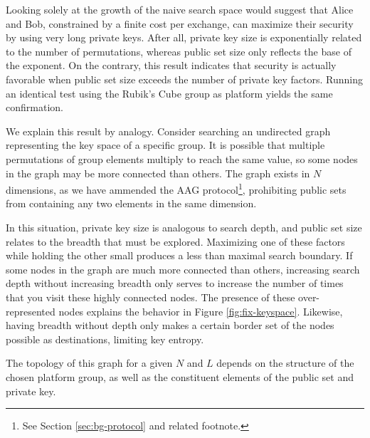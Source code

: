 Looking solely at the growth of the naive search space would suggest that Alice and Bob, constrained by a finite cost per exchange, can maximize their security by using very long private keys. After all, private key size is exponentially related to the number of permutations, whereas public set size only reflects the base of the exponent. On the contrary, this result indicates that security is actually favorable when public set size exceeds the number of private key factors. Running an identical test using the Rubik's Cube group as platform yields the same confirmation.

We explain this result by analogy. Consider searching an undirected graph representing the key space of a specific group. It is possible that multiple permutations of group elements multiply to reach the same value, so some nodes in the graph may be more connected than others. The graph exists in $N$ dimensions, as we have ammended the AAG protocol\footnote{See Section \ref{sec:bg-protocol} and related footnote.}, prohibiting public sets from containing any two elements in the same dimension.

In this situation, private key size is analogous to search depth, and public set size relates to the breadth that must be explored. Maximizing one of these factors while holding the other small produces a less than maximal search boundary. If some nodes in the graph are much more connected than others, increasing search depth without increasing breadth only serves to increase the number of times that you visit these highly connected nodes. The presence of these over-represented nodes explains the behavior in Figure \ref{fig:fix-keyspace}. Likewise, having breadth without depth only makes a certain border set of the nodes possible as destinations, limiting key entropy.

The topology of this graph for a given $N$ and $L$ depends on the structure of the chosen platform group, as well as the constituent elements of the public set and private key.